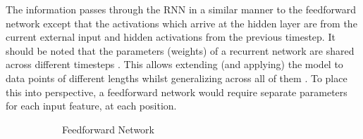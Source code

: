 \documentclass[a4paper]{book}
\begin{document}
The information passes through the RNN in a similar manner to the feedforward network except that the activations which arrive at the hidden layer are from the current external input and hidden activations from the previous timestep. It should be noted that the parameters (weights) of a recurrent network are shared across different timesteps \parencite{graves_supervised_2012}. This allows extending (and applying) the model to data points of different lengths whilst generalizing across all of them \parencite{goodfellow_deep_2016}. To place this into perspective, a feedforward network would require separate parameters for each input feature, at each position.

\begin{figure}[htbp]
    \begin{subfigure}{\linewidth}
        \centering
        \caption{Feedforward Network}
        \label{fig:feedforward_net}
        \vspace{1em}\break
    \end{subfigure}
    \begin{subfigure}{.24\linewidth}
\end{subfigure}
\end{figure}
\end{document}
